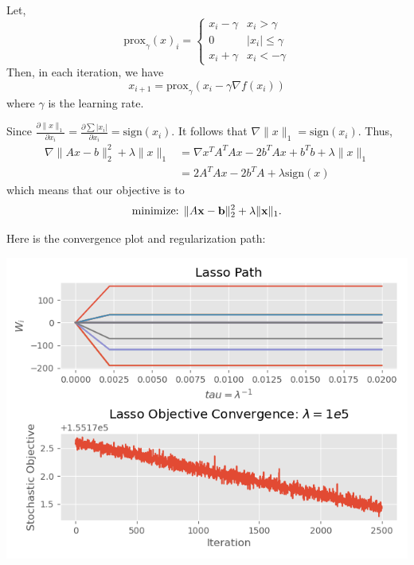 \documentclass[12pt,letterpaper,fleqn]{hmcpset}
\begin{document}
\begin{solution}
Let,
$$
\text{prox}_{\gamma}(x)_i = 
\begin{cases}
x_i - \gamma & x_i > \gamma \\
0 & |x_i| \leq \gamma \\
x_i + \gamma & x_i < -\gamma
\end{cases}
$$
Then, in each iteration, we have
$$
x_{i+1} = \text{prox}_{\gamma} (x_i - \gamma \nabla f(x_i))
$$
where \(\gamma\) is the learning rate.

Since \(\frac{\partial \|x\|_1}{\partial x_i} = \frac{\partial \sum |x_i|}{\partial x_i} = \text{sign}(x_i)\). It follows that \(\nabla \|x\|_1 = \text{sign}(x_i)\). Thus,
\begin{align*}
	\nabla \|Ax - b\|_2^2 + \lambda \|x\|_1 &= \nabla x^T A^T Ax - 2b^T Ax + b^T b + \lambda \|x\|_1\\
&= 2A^T Ax - 2b^T A + \lambda \text{sign}(x)
\end{align*}
which means that our objective is to
$$\text{minimize: } \|A{\bf x} - {\bf b}\|_2^2 + \lambda \|{\bf x}\|_1.$$

Here is the convergence plot and regularization path:
\begin{center}
	\includegraphics{hw7pr2_lasso.png}
\end{center}


\end{solution}
\newpage
\end{document}
